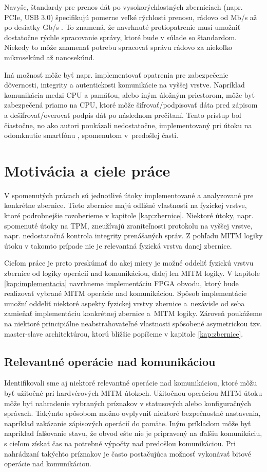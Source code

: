 Navyše, štandardy pre prenos dát po vysokorýchlostných zberniciach (napr. PCIe, USB 3.0) špecifikujú pomerne veľké rýchlosti prenosu, rádovo od Mb/s až po desiatky Gb/s \cite{pcieSpec, usbSpec}. To znamená, že navrhnuté protiopatrenie musí umožniť dostatočne rýchle spracovanie správy, ktoré bude v súlade so štandardom. Niekedy to môže znamenať potrebu spracovať správu rádovo za niekoľko mikrosekúnd až nanosekúnd.

Iná možnosť môže byť napr. implementovať opatrenia pre zabezpečenie dôvernosti, integrity a autentickosti komunikácie na vyššej vrstve. Napríklad komunikácia medzi CPU a pamäťou, alebo iným úložným priestorom, môže byť zabezpečená priamo na CPU, ktoré môže šifrovať/podpisovať dáta pred zápisom a dešifrovať/overovať podpis dát po následnom prečítaní. Tento prístup bol čiastočne, no ako autori poukázali nedostatočne, implementovaný pri útoku na odomknutie smartfónu \cite{mitmSmartphone}, spomenutom v~predošlej časti.

\section{Motivácia a ciele práce}
V spomenutých prácach sú jednotlivé útoky implementované a analyzované pre konkrétne zbernice. Tieto zbernice majú odlišné vlastnosti na fyzickej vrstve, ktoré podrobnejšie rozoberieme v kapitole \ref{kap:zbernice}. Niektoré útoky, napr. spomenuté útoky na TPM, zneužívajú zraniteľnosti protokolu na vyššej vrstve, napr. nedostatočná kontrola integrity prenášaných správ. Z pohľadu MITM logiky útoku v takomto prípade nie je relevantná fyzická vrstva danej zbernice.

Cieľom práce je preto preskúmať do akej miery je možné oddeliť fyzickú vrstvu zbernice od logiky operácií nad komunikáciou, ďalej len MITM logiky. V kapitole \ref{kap:implementacia} navrhneme implementáciu FPGA obvodu, ktorý bude realizovať vybrané MITM operácie nad komunikáciou. Spôsob implementácie umožní oddeliť niektoré aspekty fyzickej vrstvy zbernice a~nezávisle od seba zamieňať implementáciu konkrétnej zbernice a~MITM logiky. Zároveň poukážeme na niektoré principiálne neabstrahovateľné vlastnosti spôsobené asymetrickou tzv. master-slave architektúrou, ktorú bližšie popíšeme v kapitole \ref{kap:zbernice}.

\subsection{Relevantné operácie nad komunikáciou}
Identifikovali sme aj niektoré relevantné operácie nad komunikáciou, ktoré môžu byť užitočné pri hardvérových MITM útokoch. Užitočnou operáciou MITM útoku môže byť nahradenie vybraných príznakov v statusových alebo konfiguračných správach. Takýmto spôsobom možno ovplyvniť niektoré bezpečnostné nastavenia, napríklad zakázanie zápisových operácií do pamäte. Iným príkladom môže byť napríklad falšovanie stavu, že obvod ešte nie je pripravený na ďalšiu komunikáciu, s cieľom získať čas na potrebné výpočty nad predošlou komunikáciou. Pri nahrádzaní takýchto príznakov je často postačujúca možnosť vykonávať bitové operácie nad komunikáciou.

